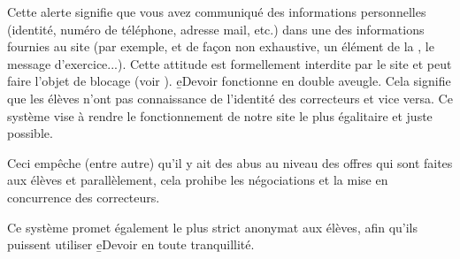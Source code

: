 ﻿Cette alerte signifie que vous avez communiqué des informations personnelles (identité, numéro de téléphone, adresse mail, etc.) dans une des informations fournies au site (par exemple, et de façon non exhaustive, un élément de la , le message d’exercice...). Cette attitude est formellement interdite par le site et peut faire l’objet de blocage (voir ).
\b{eDevoir} fonctionne en double aveugle. Cela signifie que les élèves n’ont pas connaissance de l’identité des correcteurs et vice versa. Ce système vise à rendre le fonctionnement de notre site le plus égalitaire et juste possible.
\item Ceci empêche (entre autre) qu’il y ait des abus au niveau des offres qui sont faites aux élèves et parallèlement, cela prohibe les négociations et la mise en concurrence des correcteurs.
\item Ce système promet également le plus strict anonymat aux élèves, afin qu’ils puissent utiliser \b{eDevoir} en toute tranquillité.